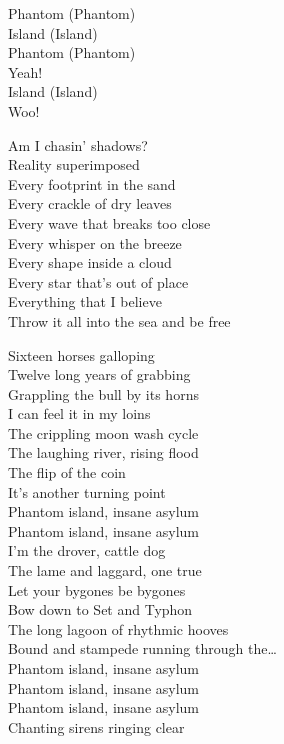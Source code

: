 Phantom (Phantom) \\
Island (Island) \\
Phantom (Phantom) \\
Yeah! \\
Island (Island) \\
Woo! \\


Am I chasin' shadows? \\
Reality superimposed \\
Every footprint in the sand \\
Every crackle of dry leaves \\
Every wave that breaks too close \\
Every whisper on the breeze \\
Every shape inside a cloud \\
Every star that's out of place \\
Everything that I believe \\
Throw it all into the sea and be free \\


Sixteen horses galloping \\
Twelve long years of grabbing \\
Grappling the bull by its horns \\
I can feel it in my loins \\
The crippling moon wash cycle \\
The laughing river, rising flood \\
The flip of the coin \\
It's another turning point \\

Phantom island, insane asylum \\
Phantom island, insane asylum \\
I'm the drover, cattle dog \\
The lame and laggard, one true  \\

Let your bygones be bygones \\
Bow down to Set and Typhon \\
The long lagoon of rhythmic hooves \\
Bound and stampede running through the… \\

Phantom island, insane asylum \\
Phantom island, insane asylum \\
Phantom island, insane asylum \\
Chanting sirens ringing clear \\

